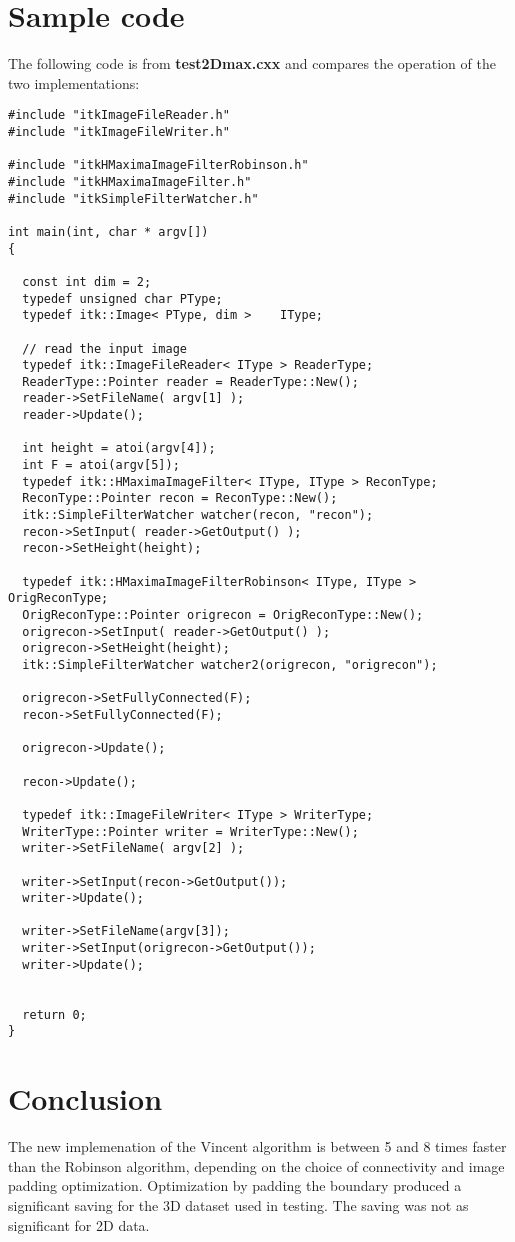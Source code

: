 \documentclass{InsightArticle}
\begin{document}
\section{Sample code}
The following code is from {\bf test2Dmax.cxx} and compares the
operation of the two implementations:
\small \begin{verbatim}
#include "itkImageFileReader.h"
#include "itkImageFileWriter.h"

#include "itkHMaximaImageFilterRobinson.h"
#include "itkHMaximaImageFilter.h"
#include "itkSimpleFilterWatcher.h"

int main(int, char * argv[])
{

  const int dim = 2;
  typedef unsigned char PType;
  typedef itk::Image< PType, dim >    IType;
  
  // read the input image
  typedef itk::ImageFileReader< IType > ReaderType;
  ReaderType::Pointer reader = ReaderType::New();
  reader->SetFileName( argv[1] );
  reader->Update();
  
  int height = atoi(argv[4]);
  int F = atoi(argv[5]);
  typedef itk::HMaximaImageFilter< IType, IType > ReconType;
  ReconType::Pointer recon = ReconType::New();
  itk::SimpleFilterWatcher watcher(recon, "recon");
  recon->SetInput( reader->GetOutput() );
  recon->SetHeight(height);
 
  typedef itk::HMaximaImageFilterRobinson< IType, IType > OrigReconType;
  OrigReconType::Pointer origrecon = OrigReconType::New();
  origrecon->SetInput( reader->GetOutput() );
  origrecon->SetHeight(height);
  itk::SimpleFilterWatcher watcher2(origrecon, "origrecon");

  origrecon->SetFullyConnected(F);
  recon->SetFullyConnected(F);
    
  origrecon->Update();

  recon->Update();

  typedef itk::ImageFileWriter< IType > WriterType;
  WriterType::Pointer writer = WriterType::New();
  writer->SetFileName( argv[2] );

  writer->SetInput(recon->GetOutput());
  writer->Update();

  writer->SetFileName(argv[3]);
  writer->SetInput(origrecon->GetOutput());
  writer->Update();
  

  return 0;
}

\end{verbatim}
\normalsize

\section{Conclusion}
The new implemenation of the Vincent algorithm is between 5 and 8
times faster than the Robinson algorithm, depending on the choice of
connectivity and image padding optimization. Optimization by padding
the boundary produced a significant saving for the 3D dataset used in
testing. The saving was not as significant for 2D data.




%

\end{document}

